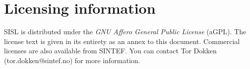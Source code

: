 \section{Licensing information}
SISL is distributed under the \emph{GNU Affero General Public License} (aGPL).  The license text 
is given in its entirety as an annex to this document.  Commercial licenses are also
available from SINTEF.  You can contact Tor Dokken (tor.dokken@sintef.no) for more
information.

